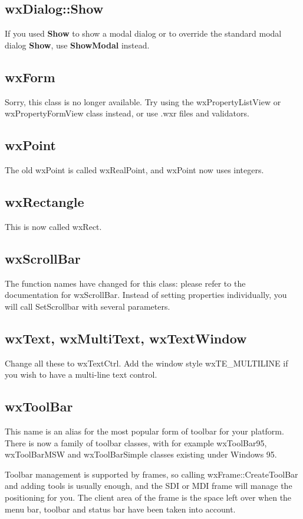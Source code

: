 \subsection{wxDialog::Show}

If you used {\bf Show} to show a modal dialog or to override the standard
modal dialog {\bf Show}, use {\bf ShowModal} instead.



\subsection{wxForm}

Sorry, this class is no longer available. Try using the wxPropertyListView or wxPropertyFormView class
instead, or use .wxr files and validators.

\subsection{wxPoint}

The old wxPoint is called wxRealPoint, and wxPoint now uses integers.

\subsection{wxRectangle}

This is now called wxRect.

\subsection{wxScrollBar}

The function names have changed for this class: please refer to the documentation for wxScrollBar. Instead
of setting properties individually, you will call SetScrollbar with several parameters.

\subsection{wxText, wxMultiText, wxTextWindow}

Change all these to wxTextCtrl. Add the window style wxTE\_MULTILINE if you
wish to have a multi-line text control.

\subsection{wxToolBar}

This name is an alias for the most popular form of toolbar for your platform. There is now a family
of toolbar classes, with for example wxToolBar95, wxToolBarMSW and wxToolBarSimple classes existing
under Windows 95.

Toolbar management is supported by frames, so calling wxFrame::CreateToolBar and adding tools is usually
enough, and the SDI or MDI frame will manage the positioning for you. The client area of the frame is the space
left over when the menu bar, toolbar and status bar have been taken into account.

